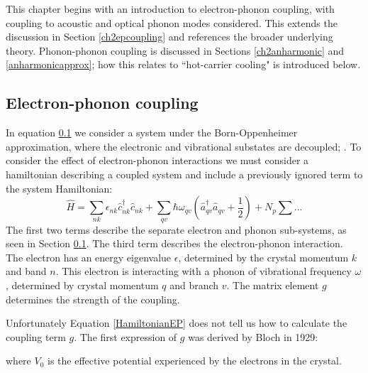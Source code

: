 This chapter begins with an introduction to electron-phonon coupling, with coupling to acoustic and optical phonon modes considered. This extends the discussion in Section \ref{ch2epcoupling} and references the broader underlying theory. Phonon-phonon coupling is discussed in Sections \ref{ch2anharmonic} and \ref{anharmonicapprox}; how this relates to ``hot-carrier cooling" is introduced below.


\subsection{Electron-phonon coupling}
In equation \ref{} we consider a system under the Born-Oppenheimer approximation, where the electronic and vibrational substates are decoupled; $ $.%
To consider the effect of electron-phonon interactions we must consider a hamiltonian describing a coupled system and include a previously ignored term to the system Hamiltonian:\cite{Giustino2017}
\begin{equation} \label{HamiltonianEP}
    \hat{H} = \sum_{nk}\epsilon_{nk}\hat{c}^{\dagger}_{nk}\hat{c}_{nk} + \sum_{qv}\hbar\omega_{qv}(\hat{a}^{\dagger}_{qv}\hat{a}_{qv}+\frac{1}{2})+N_p\sum...
\end{equation}
The first two terms describe the separate electron and phonon sub-systems, as seen in Section \ref{}. The third term describes the electron-phonon interaction. The electron has an energy eigenvalue $\epsilon$, determined by the crystal momentum $k$ and band $n$. This electron is interacting with a phonon of vibrational frequency $\omega$  , determined by crystal momentum $q$ and branch $v$. The matrix element $g$ determines the strength of the coupling. 

Unfortunately Equation \ref{HamiltonianEP} does not tell us how to calculate the coupling term $g$. The first expression of $g$ was derived by Bloch in 1929:
    
where $V_0$ is the effective potential experienced by the electrons in the crystal.

